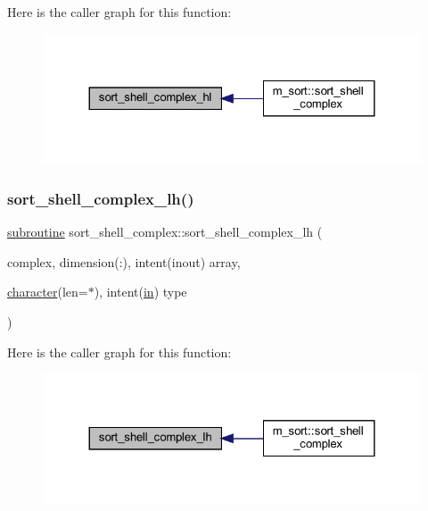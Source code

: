 Here is the caller graph for this function\+:
\nopagebreak
\begin{figure}[H]
\begin{center}
\leavevmode
\includegraphics[width=324pt]{M__sort_8f90_a6fafc1b948c7b07b66615208dd7fbc23_icgraph}
\end{center}
\end{figure}
\mbox{\label{M__sort_8f90_a5c16be512f55ef72b6777c149821ffa8}} 
\subsubsection{\texorpdfstring{sort\+\_\+shell\+\_\+complex\+\_\+lh()}{sort\_shell\_complex\_lh()}}
{\footnotesize\ttfamily \hyperlink{M__stopwatch_83_8txt_acfbcff50169d691ff02d4a123ed70482}{subroutine} sort\+\_\+shell\+\_\+complex\+::sort\+\_\+shell\+\_\+complex\+\_\+lh (\begin{DoxyParamCaption}\item[{complex, dimension(\+:), intent(inout)}]{array,  }\item[{\hyperlink{option__stopwatch_83_8txt_abd4b21fbbd175834027b5224bfe97e66}{character}(len=$\ast$), intent(\hyperlink{M__journal_83_8txt_afce72651d1eed785a2132bee863b2f38}{in})}]{type }\end{DoxyParamCaption})\hspace{0.3cm}{\ttfamily [private]}}

Here is the caller graph for this function\+:
\nopagebreak
\begin{figure}[H]
\begin{center}
\leavevmode
\includegraphics[width=324pt]{M__sort_8f90_a5c16be512f55ef72b6777c149821ffa8_icgraph}
\end{center}
\end{figure}
\mbox{\label{M__sort_8f90_a2710b2c0c881eed2f89f6bf5674f73bc}} 
